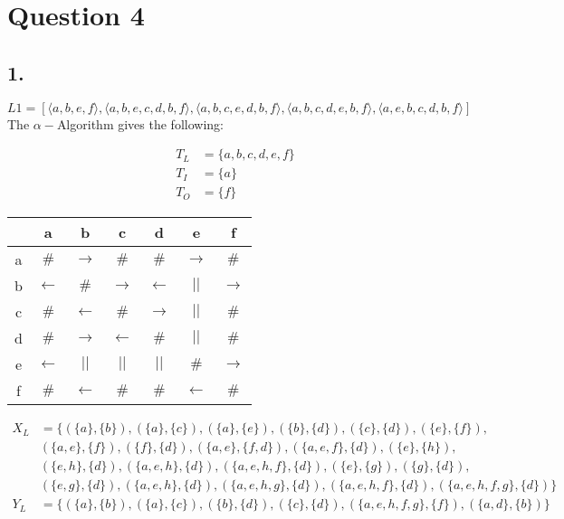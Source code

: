 \section*{Question 4}
\subsection*{1.}
\begin{equation*}
L1= [\langle a,b,e,f\rangle ,\langle a,b,e,c,d,b,f\rangle ,\langle a,b,c,e,d,b
,f\rangle ,\langle a,b,c,d,e,b,f\rangle ,\langle a,e,b,c,d,b,f\rangle ]
\end{equation*}
The $\alpha-$Algorithm gives the following:

\begin{align*}
T_L &= \{ a,b,c,d,e,f\}\\
T_I &= \{a\}\\
T_O &= \{f\}
\end{align*}
\begin{tabular}{c | c c c c c c}
	&a 	  &b 			 &c 			&d 	  			&e 			   &f\\
	\hline
a	&$\#$ &$\rightarrow$ &$\#$ 			&$\#$ 			&$\rightarrow$ &$\#$\\
b	&$\leftarrow$ &$\#$			 &$\rightarrow$ &$\leftarrow$ 			&$||$ 		  
&$\rightarrow$\\
c	&$\#$ &$\leftarrow$			 &$\#$			&$\rightarrow$  &$||$ 		   &$\#$\\
d	&$\#$ &$\rightarrow$ &$\leftarrow$			&$\#$			&$||$ 		   &$\#$\\
e	&$\leftarrow$ &$||$ 		 &$||$			&$||$  			&$\#$		   &$\rightarrow$\\
f	&$\#$ &$\leftarrow$	 &$\#$			&$\#$			&$\leftarrow$		   &$\#$\\
\end{tabular}

\begin{align*}
X_L &= \{ (\{a\},\{b\}),(\{a\},\{c\})
,(\{a\},\{e\}),(\{b\},\{d\}),(\{c\},\{d\}),(\{e\},\{f\}),\\
&(\{a,e\},\{f\}),(\{f\},\{d\}),(\{a,e\},\{f,d\}),(\{a,e,f\},\{d\}),(\{e\},\{h\}),\\
&(\{e,h\},\{d\}),(\{a,e,h\},\{d\}),(\{a,e,h,f\},\{d\}),(\{e\},\{g\}),(\{g\},\{d\}),\\
&(\{e,g\},\{d\}),(\{a,e,h\},\{d\}),(\{a,e,h,g\},\{d\}),(\{a,e,h,f\},\{d\}),(\{a,e,h,f,g\},\{d\})\}\\
Y_L &=
\{(\{a\},\{b\}),(\{a\},\{c\}),(\{b\},\{d\}),(\{c\},\{d\}),(\{a,e,h,f,g\},\{f\}),(\{a,d\},\{b\})\}\\
\end{align*}

